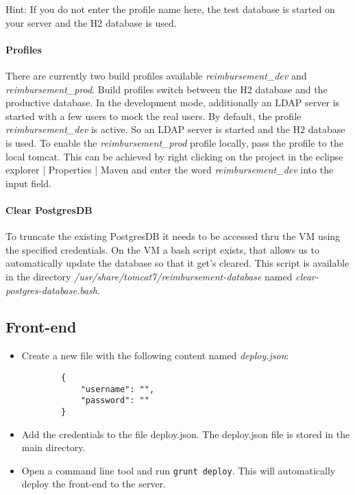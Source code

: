 Hint: If you do not enter the profile name here, the test database is started on your server and the H2 database is used.

\paragraph{Profiles}
There are currently two build profiles available \textit{reimbursement\_dev} and \newline \textit{reimbursement\_prod}. Build profiles switch between the H2 database and the productive database. In the development mode, additionally an LDAP server is started with a few users to mock the real users.\newline
By default, the profile \textit{reimbursement\_dev} is active. So an LDAP server is started and the H2 database is used. To enable the \textit{reimbursement\_prod} profile locally, pass the profile to the local tomcat. This can be achieved by right clicking on the project in the eclipse explorer | Properties | Maven and enter the word \textit{reimbursement\_dev} into the input field.

\paragraph{Clear PostgresDB}
\label{sec:clear-postgresdb}
To truncate the existing PostgresDB it needs to be accessed thru the VM using the specified credentials. On the VM a bash script exists, that allows us to automatically update the database so that it get's cleared. This script is available in the directory \textit{/usr/share/tomcat7/reimbursement-database} named \textit{clear-postgres-database.bash}.

\subsection{Front-end}

\begin{itemize}

    \item Create a new file with the following content named \textit{deploy.json}:
    \begin{lstlisting}
        {
            "username": "",
            "password": ""
        }
    \end{lstlisting}
    \item Add the credentials to the file deploy.json. The deploy.json file is stored in the main directory.
    \item Open a command line tool and run \texttt{grunt deploy}. This will automatically deploy the front-end to the server.

\end{itemize}

